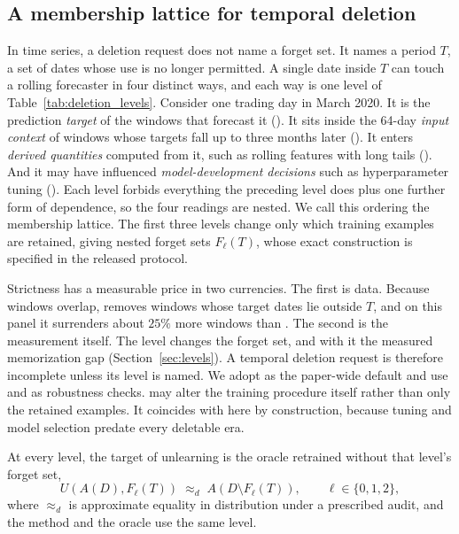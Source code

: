\subsection{A membership lattice for temporal deletion}

In time series, a deletion request does not name a forget set. It
names a period $T$, a set of dates whose use is no longer permitted.
A single date inside $T$ can touch a rolling forecaster in four
distinct ways, and each way is one level of
Table~\ref{tab:deletion_levels}. Consider one trading day in March
2020. It is the prediction \emph{target} of the windows that
forecast it (\Lzero). It sits inside the 64-day \emph{input context}
of windows whose targets fall up to three months later (\Lone). It
enters \emph{derived quantities} computed from it, such as rolling
features with long tails (\Ltwo). And it may have influenced
\emph{model-development decisions} such as hyperparameter tuning
(\Lthree). Each level forbids everything the preceding level does
plus one further form of dependence, so the four readings are
nested. We call this ordering the membership lattice. The first
three levels change only which training examples are retained,
giving nested forget sets $F_\ell(T)$, whose exact construction is
specified in the released protocol.

Strictness has a measurable price in two currencies. The first is
data. Because windows overlap, \Lone{} removes windows whose target
dates lie outside $T$, and on this panel it surrenders about $25\%$
more windows than \Lzero. The second is the measurement itself. The
level changes the forget set, and with it the measured memorization
gap (Section~\ref{sec:levels}). A temporal deletion request is therefore incomplete unless its
level is named. We adopt \Lone{} as the paper-wide default and use
\Lzero{} and \Ltwo{} as robustness checks. \Lthree{} may alter the
training procedure itself rather than only the retained examples.
It coincides with \Ltwo{} here by construction, because tuning and
model selection predate every deletable era.

At every level, the target of unlearning is the oracle retrained
without that level's forget set,
\begin{equation}
U\!\left(A(D),F_\ell(T)\right)
\;\approx_d\;
A\!\left(D\setminus F_\ell(T)\right),
\qquad
\ell\in\{0,1,2\},
\label{eq:unlearning}
\end{equation}
where $\approx_d$ is approximate equality in distribution under a
prescribed audit, and the method and the oracle use the same level.

